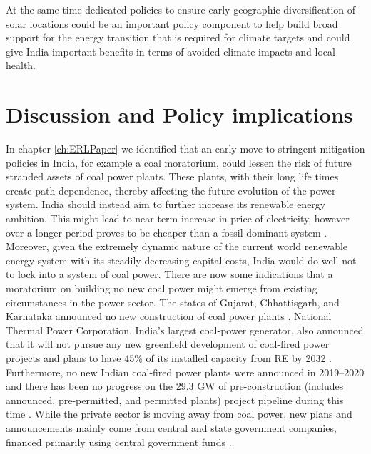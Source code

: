 \documentclass[../thesis.tex]{subfiles}
\begin{document}
At the same time dedicated policies to ensure early geographic diversification of solar locations could be an important policy component to help build broad support for the energy transition that is required for climate targets and could give India important benefits in terms of avoided climate impacts and local health. 


\section{Discussion and Policy implications}
In chapter \ref{ch:ERLPaper} we identified that an early move to stringent mitigation policies in India, for example a coal moratorium, could lessen the risk of future stranded assets of coal power plants. These plants, with their long life times create path-dependence, thereby affecting the future evolution of the power system. India should instead aim to further increase its renewable energy ambition. This might lead to near-term increase in price of electricity, however over a longer period proves to be cheaper than a fossil-dominant system \citep{luIndia2020}. Moreover, given the extremely dynamic nature of the current world renewable energy system with its steadily decreasing capital costs, India would do well not to lock into a system of coal power. There are now some indications that a moratorium on building no new coal power might emerge from existing circumstances in the power sector. The states of Gujarat, Chhattisgarh, and Karnataka  announced no new construction of coal power plants \citep{carboncopy2019}. National Thermal Power Corporation, India's largest coal-power generator, also announced that it will not pursue any new greenfield development of coal-fired power projects and plans to have 45\% of its installed capacity from RE by 2032  \citep{ians2020}. Furthermore, no new Indian coal-fired power plants were announced in 2019--2020 and there has been no progress on the 29.3 GW of pre-construction (includes announced, pre-permitted, and permitted plants) project pipeline during this time \citep{gem2021}. While the private sector is moving away from coal power, new plans and announcements mainly come from central and state government companies, financed primarily using central government funds \citep{shah2021}.
\end{document}
